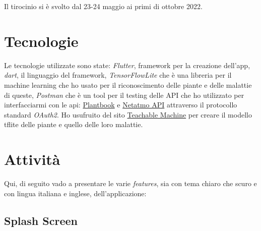 \documentclass[a4paper,12pt]{report}
\begin{document}
\textsf{\small Il tirocinio si è svolto dal 23-24 maggio ai primi di ottobre 2022.} %

\section{Tecnologie}

\textsf{\small Le tecnologie utilizzate sono state: \emph{Flutter}, framework per la creazione dell'app, \emph{dart}, il linguaggio del framework, \emph{TensorFlowLite} che è una libreria per il machine learning che ho usato per il riconoscimento delle piante e delle malattie di queste, \emph{Postman} che è un tool per il testing delle API che ho utilizzato per interfacciarmi con le api: \href{open.plantbook.io}{Plantbook} e \href{https://dev.netatmo.com/apidocumentation/oauth}{Netatmo API} attraverso il protocollo standard \emph{OAuth2}.} %
\textsf{\small Ho usufruito del sito \href{https://teachablemachine.withgoogle.com/}{Teachable Machine} per creare il modello tflite delle piante e quello delle loro malattie.}


\section{Attività}

\textsf{\small Qui, di seguito vado a presentare le varie \emph{features}, sia con tema chiaro che scuro e con lingua italiana e inglese, dell'applicazione: } %

\subsection{Splash Screen}
\end{document}
